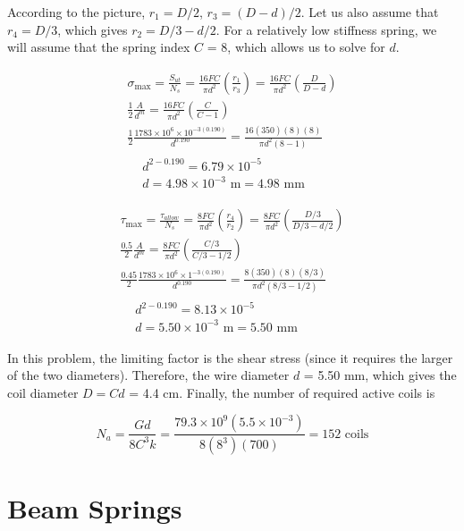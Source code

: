 \documentclass[
10pt,
a4paper,
openany,
svgnames,
]{book}
\begin{document}
\begin{solution}
According to the picture, $r_1 = D / 2$, $r_3 = (D - d) / 2$. Let us also assume that $r_4 = D / 3$, which gives $r_2 = D / 3 - d / 2$. For a relatively low stiffness spring, we will assume that the spring index $C$ = 8, which allows us to solve for $d$.

\begin{gather*}
  \sigma_{\max} = \frac{S_{ut}}{N_s} = \frac{16FC}{\pi d^2}\left( \frac{r_1}{r_3} \right) = \frac{16FC}{\pi d^2}\left( \frac{D}{D - d} \right) \\
  \frac{1}{2}\frac{A}{d^m} = \frac{16FC}{\pi d^2}\left( \frac{C}{C - 1} \right) \\ 
  \frac{1}{2}\frac{1783 \times 10^6 \times 10^{-3(0.190)}}{d^{0.190}} = \frac{16(350)(8)(8)}{\pi d^2(8 - 1)} \\
  \begin{aligned}
  &d^{2 - 0.190} = 6.79 \times 10^{-5} \\ 
  &d = 4.98 \times 10^{-3}\text{ m} = 4.98\text{ mm}
  \end{aligned}
\end{gather*}

\begin{gather*}
  \tau_{\max} = \frac{\tau_{allow}}{N_s} = \frac{8FC}{\pi d^2}\left( \frac{r_4}{r_2} \right) = \frac{8FC}{\pi d^2}\left( \frac{D/3}{D/3 - d/2} \right) \\ 
  \frac{0.5}{2}\frac{A}{d^m} = \frac{8FC}{\pi d^2}\left( \frac{C/3}{C/3 - 1/2} \right) \\ 
  \frac{0.45}{2}\frac{1783 \times 10^6 \times 1^{-3(0.190)}}{d^{0.190}} = \frac{8(350)(8)(8/3)}{\pi d^2(8/3 - 1/2)} \\
  \begin{aligned}
  &d^{2 - 0.190} = 8.13 \times 10^{-5} \\ 
  &d = 5.50 \times 10^{-3}\text{ m} = 5.50 \text{ mm}
  \end{aligned}
\end{gather*}

In this problem, the limiting factor is the shear stress (since it requires the larger of the two diameters). Therefore, the wire diameter $d$ = 5.50 mm, which gives the coil diameter $D = Cd$ = 4.4 cm. Finally, the number of required active coils is

\[N_a = \frac{Gd}{8C^3k} = \frac{79.3 \times 10^9(5.5 \times 10^{-3})}{8(8^3)(700)} = 152\text{ coils}\]
\end{solution}

\section{Beam Springs}
\end{document}
